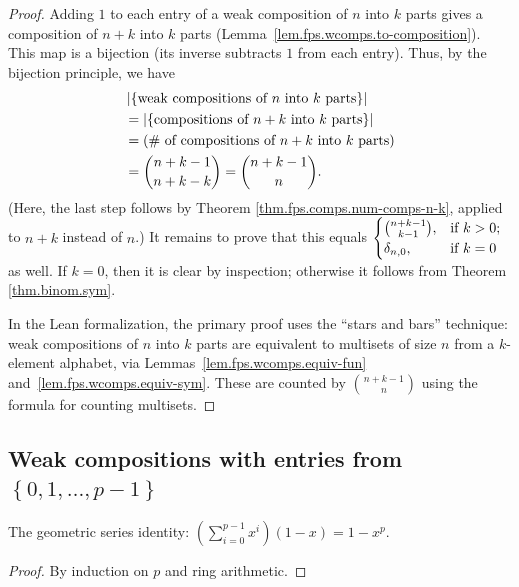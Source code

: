 \begin{proof}
Adding $1$
to each entry of a weak composition of $n$ into $k$ parts gives
a composition of $n+k$ into $k$ parts (Lemma~\ref{lem.fps.wcomps.to-composition}).
This map is a bijection (its inverse subtracts $1$ from each entry).
Thus, by the bijection principle, we
have%
\begin{align*}
&  \left\vert \left\{  \text{weak compositions of }n\text{ into }k\text{
parts}\right\}  \right\vert \\
&  =\left\vert \left\{  \text{compositions of }n+k\text{ into }k\text{
parts}\right\}  \right\vert \\
&  =\left(  \text{\# of compositions of }n+k\text{ into }k\text{ parts}\right)
\\
&  =\dbinom{n+k-1}{n+k-k}
=\dbinom{n+k-1}{n}.
\end{align*}
(Here, the last step follows by Theorem \ref{thm.fps.comps.num-comps-n-k},
applied to $n+k$ instead of $n$.)
It remains to prove that this equals $%
\begin{cases}
\dbinom{n+k-1}{k-1}, & \text{if }k>0;\\
\delta_{n,0}, & \text{if }k=0
\end{cases}
$ as well. If $k=0$, then it is clear
by inspection; otherwise it follows from Theorem \ref{thm.binom.sym}.

In the Lean formalization, the primary proof uses the ``stars and bars'' technique:
weak compositions of $n$ into $k$ parts are equivalent to multisets of size $n$ from
a $k$-element alphabet, via
Lemmas~\ref{lem.fps.wcomps.equiv-fun} and~\ref{lem.fps.wcomps.equiv-sym}.
These are counted by $\binom{n+k-1}{n}$ using the formula for counting multisets.
\end{proof}

\subsection{Weak compositions with entries from $\left\{  0,1,\ldots
,p-1\right\}  $}

\begin{lemma}
\label{lem.fps.comps.geom-series-mul}
\leanhelper
\leanok
The geometric series identity: $\left(\sum_{i=0}^{p-1} x^i\right)(1 - x) = 1 - x^p$.
\end{lemma}

\begin{proof}
By induction on $p$ and ring arithmetic.
\end{proof}

